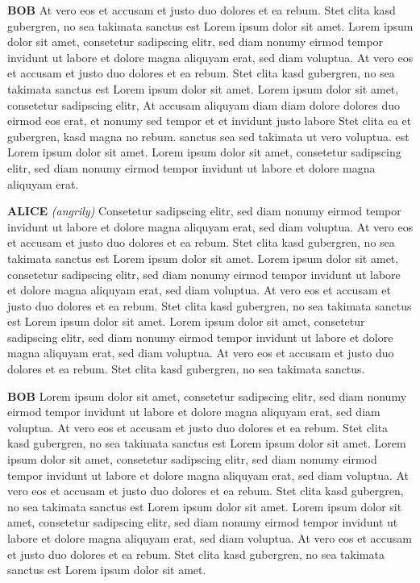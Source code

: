 \documentclass[11pt]{article}
\newcommand{\character}[1]{\textbf{\MakeUppercase{#1}}}
\newcommand{\InlineStageDirection}[1]{\textit{(#1)}}
\begin{document}
\begin{flushleft}
\character{Bob} At vero eos et accusam et justo duo dolores et ea rebum. Stet clita kasd
gubergren, no sea takimata sanctus est Lorem ipsum dolor sit amet. Lorem
ipsum dolor sit amet, consetetur sadipscing elitr, sed diam nonumy eirmod
tempor invidunt ut labore et dolore magna aliquyam erat, sed diam voluptua.
At vero eos et accusam et justo duo dolores et ea rebum. Stet clita kasd
gubergren, no sea takimata sanctus est Lorem ipsum dolor sit amet.
Lorem ipsum dolor sit amet, consetetur sadipscing elitr, At accusam
aliquyam diam diam dolore dolores duo eirmod eos erat, et nonumy sed
tempor et et invidunt justo labore Stet clita ea et gubergren, kasd magna
no rebum. sanctus sea sed takimata ut vero voluptua. est Lorem ipsum
dolor sit amet. Lorem ipsum dolor sit amet, consetetur sadipscing elitr,
sed diam nonumy eirmod tempor invidunt ut labore et dolore magna aliquyam
erat. 

\character{Alice} \InlineStageDirection{angrily} Consetetur sadipscing elitr, sed diam nonumy eirmod tempor invidunt ut
labore et dolore magna aliquyam erat, sed diam voluptua. At vero eos et
accusam et justo duo dolores et ea rebum. Stet clita kasd gubergren, no
sea takimata sanctus est Lorem ipsum dolor sit amet. Lorem ipsum dolor
sit amet, consetetur sadipscing elitr, sed diam nonumy eirmod tempor
invidunt ut labore et dolore magna aliquyam erat, sed diam voluptua. At
vero eos et accusam et justo duo dolores et ea rebum. Stet clita kasd
gubergren, no sea takimata sanctus est Lorem ipsum dolor sit amet. Lorem
ipsum dolor sit amet, consetetur sadipscing elitr, sed diam nonumy eirmod
tempor invidunt ut labore et dolore magna aliquyam erat, sed diam voluptua.
At vero eos et accusam et justo duo dolores et ea rebum. Stet clita kasd
gubergren, no sea takimata sanctus. 

\character{Bob} Lorem ipsum dolor sit amet, consetetur sadipscing elitr, sed diam nonumy
eirmod tempor invidunt ut labore et dolore magna aliquyam erat, sed diam
voluptua. At vero eos et accusam et justo duo dolores et ea rebum. Stet
clita kasd gubergren, no sea takimata sanctus est Lorem ipsum dolor sit
amet. Lorem ipsum dolor sit amet, consetetur sadipscing elitr, sed diam
nonumy eirmod tempor invidunt ut labore et dolore magna aliquyam erat,
sed diam voluptua. At vero eos et accusam et justo duo dolores et ea rebum.
Stet clita kasd gubergren, no sea takimata sanctus est Lorem ipsum dolor
sit amet. Lorem ipsum dolor sit amet, consetetur sadipscing elitr, sed diam
nonumy eirmod tempor invidunt ut labore et dolore magna aliquyam erat, sed
diam voluptua. At vero eos et accusam et justo duo dolores et ea rebum.
Stet clita kasd gubergren, no sea takimata sanctus est Lorem ipsum dolor
sit amet. 


\end{flushleft}
\end{document}
